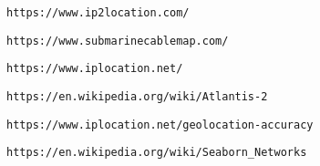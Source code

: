 \begin{thebibliography}{99}

  \texttt{https://www.ip2location.com/}

	\texttt{https://www.submarinecablemap.com/}

	\texttt{https://www.iplocation.net/}

	\texttt{https://en.wikipedia.org/wiki/Atlantis-2}

	\texttt{https://www.iplocation.net/geolocation-accuracy}

	\texttt{https://en.wikipedia.org/wiki/Seaborn\_Networks}

\end{thebibliography}